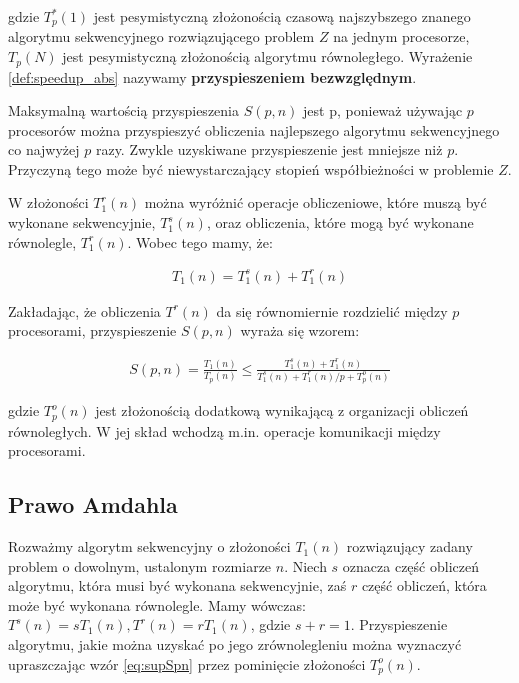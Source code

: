 \documentclass[a4paper,oneside,leqno,12pt]{book}
\theoremstyle{definition}
\theoremstyle{plain}
\theoremstyle{remark}
\begin{document}
gdzie \(T^{*}_{p}(1)\) jest pesymistyczną złożonością czasową najszybszego znanego algorytmu sekwencyjnego rozwiązującego problem \(Z\) na jednym procesorze, \(T_{p}(N)\) jest pesymistyczną złożonością algorytmu równoległego. Wyrażenie \ref{def:speedup_abs} nazywamy \textbf{przyspieszeniem bezwzględnym}.

Maksymalną wartością przyspieszenia \(S(p,n)\) jest p, ponieważ używając \(p\) procesorów można przyspieszyć obliczenia najlepszego algorytmu sekwencyjnego co najwyżej \(p\) razy. Zwykle uzyskiwane przyspieszenie jest mniejsze niż \(p\). Przyczyną tego może być niewystarczający stopień współbieżności w problemie \(Z\). 



W złożoności \(T^{r}_{1}(n)\) można wyróżnić operacje obliczeniowe, które muszą być wykonane sekwencyjnie, \(T^{s}_{1}(n)\), oraz obliczenia, które mogą być wykonane równolegle, \(T^{r}_{1}(n)\). Wobec tego mamy, że:

\begin{align}
T_{1}(n) = T^{s}_{1}(n) + T^{r}_{1}(n)
\end{align}

Zakładając, że obliczenia \(T^{r}(n)\) da się równomiernie rozdzielić między \(p\) procesorami, przyspieszenie \(S(p, n)\) wyraża się wzorem:

\begin{align}\label{eq:supSpn}
S(p, n) = \frac{T_{1}(n)}{T_{p}(n)}\leq\frac{T^{s}_{1}(n) + T^{r}_{1}(n)}{T^{s}_{1}(n) + T^{r}_{1}(n)/p + T^{o}_{p}(n)}
\end{align}


gdzie \(T^{o}_{p}(n)\) jest złożonością dodatkową wynikającą z organizacji obliczeń równoległych. W jej skład wchodzą m.in. operacje komunikacji między procesorami.




\subsection{Prawo Amdahla}

Rozważmy algorytm sekwencyjny o złożoności \(T_1(n)\) rozwiązujący zadany problem o dowolnym, ustalonym rozmiarze \(n\). Niech \(s\) oznacza część obliczeń algorytmu, która musi być wykonana sekwencyjnie, zaś \(r\) część obliczeń, która może być wykonana równolegle. Mamy wówczas: \(T^{s}(n) = sT_{1}(n), T^{r}(n)=rT_{1}(n)\), gdzie \(s+r=1\). Przyspieszenie algorytmu, jakie można uzyskać po jego zrównolegleniu można wyznaczyć upraszczając wzór \eqref{eq:supSpn} przez pominięcie złożoności \(T^{o}_{p}(n)\).
\end{document}

